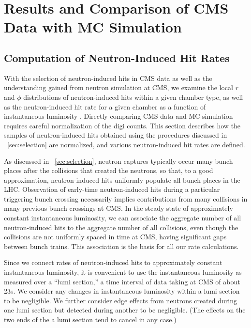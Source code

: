 \section{Results and Comparison of CMS Data with MC Simulation}
\label{sec:datamc}
\subsection{Computation of Neutron-Induced Hit Rates}
With the selection of neutron-induced hits in CMS data as well as the
understanding gained from neutron simulation at CMS, we examine the
local $r$ and $\phi$ distributions of neutron-induced hits within a
given chamber type, as well as the neutron-induced hit rate for a
given chamber as a function of instantaneous
luminosity \cite{Cousins:687399,CMS-PAS-LUM-17-001}. Directly
comparing CMS data and MC simulation requires careful normalization of
the digi counts. This section describes how the samples of
neutron-induced hits obtained using the procedures discussed in
\Sec~\ref{sec:selection} are normalized, and various
neutron-induced hit rates are defined.

As discussed in \Sec~\ref{sec:selection}, neutron captures
typically occur many bunch places after the \pp collisions that
created the neutrons, so that, to a good approximation,
neutron-induced hits uniformly populate all bunch places in the
LHC. Observation of early-time neutron-induced hits during a
particular triggering bunch crossing necessarily implies contributions
from many \pp collisions in many previous bunch crossings at CMS. In
the steady state of approximately constant instantaneous luminosity,
we can associate the aggregate number of all neutron-induced hits to
the aggregate number of all \pp collisions, even though the \pp
collisions are not uniformly spaced in time at CMS, having significant
gaps between bunch trains. This association is the basis for all our
rate calculations.

Since we connect rates of neutron-induced hits to approximately
constant instantaneous luminosity, it is convenient to use the
instantaneous luminosity as measured over a ``lumi section,'' a time
interval of data taking at CMS of about 23\unit{s}. We consider any
changes in instantaneous luminosity within a lumi section to be
negligible. We further consider edge effects from neutrons created
during one lumi section but detected during another to be negligible.
(The effects on the two ends of the a lumi section tend to cancel in
any case.)

